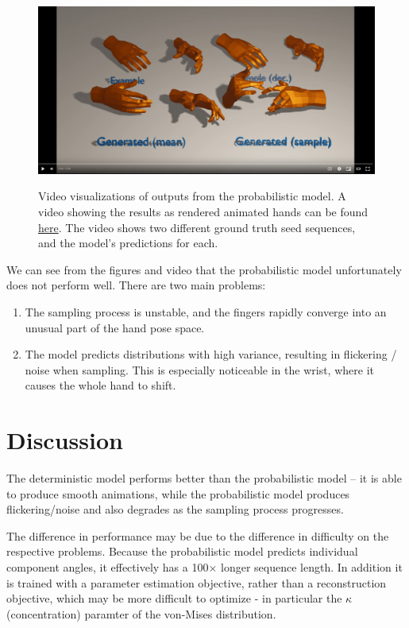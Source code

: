 \begin{figure}
    \centering
    \href{https://www.youtube.com/watch?v=moExsVteA-A}{\includegraphics[width=\linewidth]{figures/probabilistic-model-video-thumbnail.png}}
    \captionsetup{parskip=7pt}
    \caption[Video visualizations of the probabilistic model]{
        Video visualizations of outputs from the probabilistic model. A video showing the results as rendered animated hands can be found \href{https://www.youtube.com/watch?v=moExsVteA-A}{here}. The video shows two different ground truth seed sequences, and the model's predictions for each.}
    \hrulefill
    \label{fig:prob-video}
\end{figure}



We can see from the figures and video that the probabilistic model unfortunately does not perform well. There are two main problems:
\begin{enumerate}
    \item The sampling process is unstable, and the fingers rapidly converge into an unusual part of the hand pose space.
    \item The model predicts distributions with high variance, resulting in flickering / noise when sampling. This is especially noticeable in the wrist, where it causes the whole hand to shift.
\end{enumerate}

\section{Discussion}

The deterministic model performs better than the probabilistic model -- it is able to produce smooth animations, while the probabilistic model produces flickering/noise and also degrades as the sampling process progresses.

The difference in performance may be due to the difference in difficulty on the respective problems. Because the probabilistic model predicts individual component angles, it effectively has a 100$\times$ longer sequence length. In addition it is trained with a parameter estimation objective, rather than a reconstruction objective, which may be more difficult to optimize - in particular the $\kappa$ (concentration) paramter of the von-Mises distribution.

